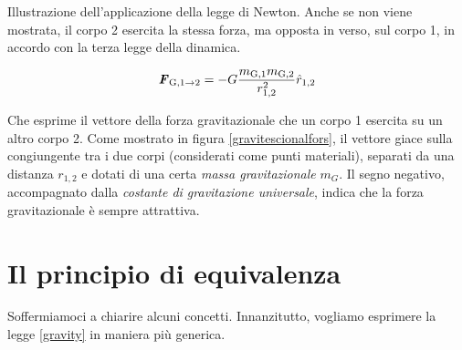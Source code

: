 \begin{marginfigure}
    \begin{center}
    \end{center}
    \caption{Illustrazione dell'applicazione della legge di Newton.
    Anche se non viene mostrata, il corpo 2 esercita la stessa
    forza, ma opposta in verso, sul corpo 1, in accordo con la
    terza legge della dinamica.}
    \label{gravitescionalfors}
\end{marginfigure}

\begin{tcolorbox}[colback = yellow!30, colframe = yellow!30!black, title = {Legge di gravitazione universale}]
    \begin{align}
        \textbf{\textit{F}}_{\text{G}, 1\to 2} = -G\frac{m_{\text{G},1}m_{\text{G},2}}{r^2_{1,2}}\hat{r}_{1,2}\label{gravity}
    \end{align}    
\end{tcolorbox}

\noindent Che esprime il vettore della forza gravitazionale che un corpo 1 esercita su un
altro corpo 2. Come mostrato in figura \ref{gravitescionalfors}, il vettore giace sulla congiungente tra i due corpi (considerati come
punti materiali), separati da una distanza $r_{1,2}$ e dotati di una certa
\textit{massa gravitazionale} $m_G$. Il segno negativo, accompagnato dalla
\textit{costante di gravitazione universale}, indica che la forza gravitazionale è
sempre attrattiva.

\section{Il principio di equivalenza}
Soffermiamoci a chiarire alcuni concetti. Innanzitutto, vogliamo esprimere la legge
\ref{gravity} in maniera più generica.


